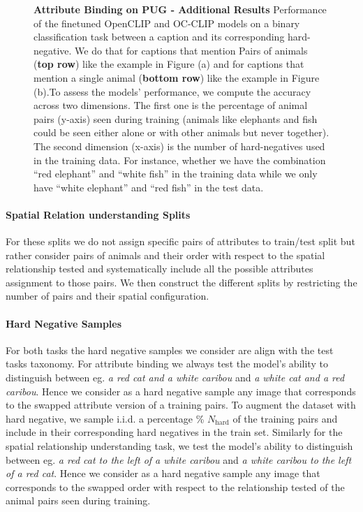 \begin{figure*}[ht]
  \caption{\small{\textbf{Attribute Binding on PUG - Additional Results}
  Performance of the finetuned OpenCLIP and OC-CLIP models on a binary classification task between a caption and its corresponding hard-negative. We do that for captions that mention Pairs of animals (\textbf{top row}) like the example in Figure (a) and for captions that mention a single animal (\textbf{bottom row}) like the example in Figure (b).To assess the models' performance, we compute the accuracy across two dimensions. The first one is the percentage of animal pairs (y-axis) seen during training (animals like elephants and fish could be seen either alone or with other animals but never together). The second dimension (x-axis) is the number of hard-negatives used in the training data. For instance, whether we have the combination ``red elephant'' and ``white fish'' in the training data while we only have ``white elephant'' and ``red fish'' in the test data. }}
  \label{fig:abla_attr}
\end{figure*}

\paragraph{Spatial Relation understanding Splits} For these splits we do not assign specific pairs of attributes to train/test split but rather consider pairs of animals and their order with respect to the spatial relationship tested and systematically include all the possible attributes assignment to those pairs. We then construct the different splits by restricting the number of pairs and their spatial configuration. 
\paragraph{Hard Negative Samples} For both tasks the hard negative samples we consider are align with the test tasks taxonomy. For attribute binding we always test the model's ability to distinguish between eg. \emph{a red cat and a white caribou} and \emph{a white cat and a red caribou}. Hence we consider as a hard negative sample any image that corresponds to the swapped attribute version of a training pairs. To augment the dataset with hard negative, we sample i.i.d. a percentage \%  $N_{\text{hard}}$ of the training pairs and include in their corresponding hard negatives in the train set.
Similarly for the spatial relationship understanding task, we test the model's ability to distinguish between eg. \emph{a red cat to the left of a white caribou} and \emph{a white caribou to the left of a red cat}. Hence we consider as a hard negative sample any image that corresponds to the swapped order with respect to the relationship tested of the animal pairs seen during training.
    
